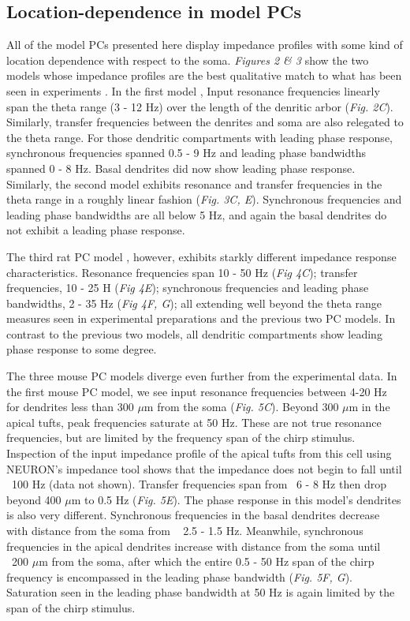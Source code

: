 \documentclass[utf8]{frontiersSCNS} %
\begin{document}
\subsection{Location-dependence in model PCs}
All of the model PCs presented here display impedance profiles with some kind of location dependence with respect to the soma.
\emph{Figures 2 \& 3} show the two models whose impedance profiles are the best qualitative match to what has been seen in experiments \citep{Ulrich2002-dd, Dembrow2015-zb, Das2017-nz}.
In the first model \citep{Hay2011-if}, Input resonance frequencies linearly span the theta range (3 - 12 Hz) over the length of the denritic arbor (\emph{Fig. 2C}).
Similarly, transfer frequencies between the denrites and soma are also relegated to the theta range. 
For those dendritic compartments with leading phase response, synchronous frequencies spanned 0.5 - 9 Hz and leading phase bandwidths spanned 0 - 8 Hz.
Basal dendrites did now show leading phase response.
Similarly, the second model \citep{Acker2009-yj} exhibits resonance and transfer frequencies in the theta range in a roughly linear fashion (\emph{Fig. 3C, E}).
Synchronous frequencies and leading phase bandwidths are all below 5 Hz, and again the basal dendrites do not exhibit a leading phase response.

The third rat PC model \citep{Kole2008-aj}, however, exhibits starkly different impedance response characteristics.  
Resonance frequencies span 10 - 50 Hz (\emph{Fig 4C}); transfer frequencies, 10 - 25 H (\emph{Fig 4E}); synchronous frequencies and leading phase bandwidths, 2 - 35 Hz (\emph{Fig 4F, G}); 
all extending well beyond the theta range measures seen in experimental preparations and the previous two PC models.
In contrast to the previous two models, all dendritic compartments show leading phase response to some degree.

The three mouse PC models diverge even further from the experimental data.
In the first mouse PC model, we see input resonance frequencies between 4-20 Hz for dendrites
less than 300 $\mu$m from the soma (\emph{Fig. 5C}).  Beyond 300 $\mu$m in the apical tufts, peak frequencies saturate at 50 Hz.  
These are not true resonance frequencies, but are limited by the frequency span of the chirp stimulus.  
Inspection of the input impedance profile of the apical tufts from this cell using NEURON's impedance tool
shows that the impedance does not begin to fall until ~100 Hz (data not shown).
Transfer frequencies span from ~6 - 8 Hz then drop beyond 400 $\mu$m to 0.5 Hz (\emph{Fig. 5E}).  
The phase response in this model's dendrites is also very different.  Synchronous frequencies in the basal dendrites 
decrease with distance from the soma from ~ 2.5 - 1.5 Hz.  Meanwhile, synchronous frequencies in the apical dendrites
increase with distance from the soma until ~200 $\mu$m from the soma, after which the entire 0.5 - 50 Hz span of the 
chirp frequency is encompassed in the leading phase bandwidth (\emph{Fig. 5F, G}).  
Saturation seen in the leading phase bandwidth at 50 Hz is again limited by the span of the chirp stimulus.
\end{document}
